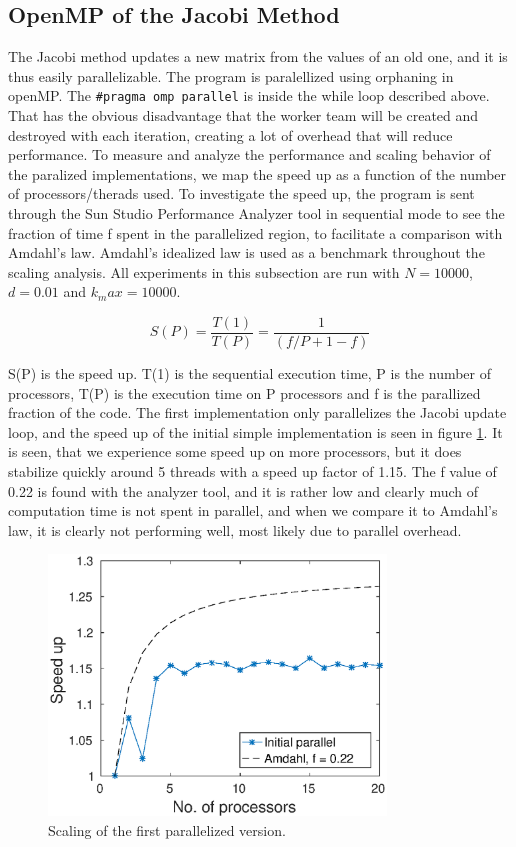 \subsection{OpenMP of the Jacobi Method}
The Jacobi method updates a new matrix from the values of an old one, and it is thus easily parallelizable. The program is paralellized using orphaning in openMP. The \texttt{\#pragma omp parallel} is inside the while loop described above. That has the obvious disadvantage that the worker team will be created and destroyed with each iteration, creating a lot of overhead that will reduce performance. To measure and analyze the performance and scaling behavior of the paralized implementations, we map the speed up as a function of the number of processors/therads used. To investigate the speed up, the program is sent through the Sun Studio Performance Analyzer tool in sequential mode to see the fraction of time f spent in the parallelized region, to facilitate a comparison with Amdahl's law. Amdahl's idealized law is used as a benchmark throughout the scaling analysis. All experiments in this subsection are run with $N = 10000$, $d = 0.01$ and $k_max = 10000$.

\begin{equation}
S(P)=\dfrac{T(1)}{T(P)}=\dfrac{1}{(f/P+1-f)}
\end{equation}

S(P) is the speed up. T(1) is the sequential execution time, P is the number of processors, T(P) is the execution time on P processors and f is the parallized fraction of the code. The first implementation only parallelizes the Jacobi update loop, and the speed up of the initial simple implementation is seen in figure \ref{fig:omp_scale1}. It is seen, that we experience some speed up on more processors, but it does stabilize quickly around 5 threads with a speed up factor of 1.15. The f value of 0.22 is found with the analyzer tool, and it is rather low and clearly much of computation time is not spent in parallel, and when we compare it to Amdahl's law, it is clearly not performing well, most likely due to parallel overhead.

\begin{figure}[h!]
\centering
\includegraphics[width = 0.8\textwidth]{fig/speedup_omp.eps}
\caption{Scaling of the first parallelized version.}
\label{fig:omp_scale1}
\end{figure}

